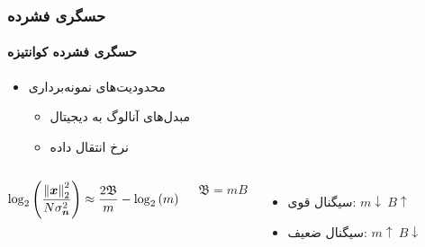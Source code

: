 \begin{frame}
\frametitle{حسگری فشرده}
\framesubtitle{حسگری فشرده کوانتیزه}
\begin{itemize}
\item{محدودیت‌های نمونه‌برداری}
\begin{itemize}
\item{مبدل‌های آنالوگ به دیجیتال}
\item{نرخ انتقال داده}
\end{itemize}
\end{itemize}
\pause
\begin{columns} 

\begin{block}{}
\begin{align}
\label{eq5}
\log_{2}\left( \dfrac{\left\lVert\bm{x}\right\rVert_{2}^{2}}{N \sigma^{2}_{\bm{n}}}\right)\approx \dfrac{2\mathfrak{B}}{m}-\log_{2}\left(m\right)
\end{align}
\end{block}
\begin{center}
$\mathfrak{B}=mB$
\end{center}
\pause
\begin{itemize}
\item{سیگنال قوی: $m\downarrow~ B \uparrow$}
\item{سیگنال ضعیف: $m\uparrow~ B \downarrow$}
\end{itemize}
\end{columns}
\cite{laska2012regime}
\end{frame}
